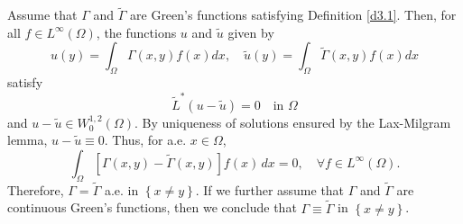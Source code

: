 \documentclass[12pt,reqno]{amsart}
\theoremstyle{plain}
\theoremstyle{definition}
\newcommand{\Ga}{\Gamma}
\newcommand{\Om}{\Omega}
\newcommand{\set}[1]{\left\{#1\right\}}
\newcommand{\brac}[1]{\left[#1\right]}
\newcommand{\pr}[1]{\left( #1 \right) }
\begin{document}
\begin{appendix}
Assume that $\Ga$ and $\widetilde \Ga$ are Green's functions satisfying Definition \ref{d3.1}. 
Then, for all $f \in L^\infty\pr{\Om}$, the functions $u$ and $\widetilde{u}$ given by
\begin{equation*}
u\pr{y}
=\int_{\Om} \Ga\pr{x,y} f\pr{x} dx, \quad 
\widetilde{u}\pr{y}
=\int_{\Om} \widetilde{\Ga}\pr{x,y} f\pr{x} dx
\end{equation*}
satisfy
\begin{equation*}
\widetilde{L}^* \pr{u - \widetilde{u}}=0 \quad \text{in } \Om
\end{equation*}
and $u-\widetilde{u}\in W^{1,2}_0(\Om)$.  
By uniqueness of solutions ensured by the Lax-Milgram lemma, $u-\widetilde{u}\equiv 0$.  
Thus, for a.e. $x\in \Om$,
\begin{equation*}
\int_{\Om} \brac{\Ga(x,y)-\widetilde{\Ga}(x,y)} f(x) \, dx=0, \quad 
\forall f\in L^\infty(\Om).
\end{equation*}
Therefore, $\Ga = \widetilde \Ga$ a.e. in $\set{x \ne y}$.
If we further assume that $\Ga$ and $\widetilde \Ga$ are continuous Green's functions, then we conclude that $\Ga \equiv \widetilde \Ga$ in $\set{x \ne y}$.


\end{appendix}
\end{document}
